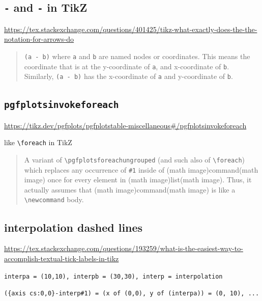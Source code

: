 \documentclass[
]{book}
\theoremstyle{definition}
\theoremstyle{definition}
\theoremstyle{definition}
\theoremstyle{definition}
\theoremstyle{remark}
\begin{document}
\subsection{\texorpdfstring{\texttt{\textbar{}-} and \texttt{-\textbar{}} in TikZ}{\textbar- and -\textbar{} in TikZ}}\label{and---in-tikz}

\url{https://tex.stackexchange.com/questions/401425/tikz-what-exactly-does-the-the-notation-for-arrows-do}

\begin{quote}
\texttt{(a\ -\textbar{}\ b)} where \texttt{a} and \texttt{b} are named nodes or coordinates. This means the coordinate that is at the y-coordinate of \texttt{a}, and x-coordinate of \texttt{b}. Similarly, \texttt{(a\ \textbar{}-\ b)} has the x-coordinate of \texttt{a} and y-coordinate of \texttt{b}.
\end{quote}

\subsection{\texorpdfstring{\texttt{pgfplotsinvokeforeach}}{pgfplotsinvokeforeach}}\label{pgfplotsinvokeforeach}

\url{https://tikz.dev/pgfplots/pgfplotstable-miscellaneous\#/pgfplotsinvokeforeach}

like \texttt{\textbackslash{}foreach} in TikZ

\begin{quote}
A variant of \texttt{\textbackslash{}pgfplotsforeachungrouped} (and such also of \texttt{\textbackslash{}foreach}) which replaces any occurrence of \texttt{\#1} inside of (math image)command(math image) once for every element in (math image)list(math image). Thus, it actually assumes that (math image)command(math image) is like a \texttt{\textbackslash{}newcommand} body.
\end{quote}

\subsection{interpolation dashed lines}\label{interpolation-dashed-lines}

\url{https://tex.stackexchange.com/questions/193259/what-is-the-easiest-way-to-accomplish-textual-tick-labels-in-tikz}

\texttt{interpa\ =\ (10,10),\ interpb\ =\ (30,30),\ interp\ =\ interpolation}

\texttt{(\{axis\ cs:0,0\}\textbar{}-interp\#1)\ =\ (x\ of\ (0,0),\ y\ of\ (interpa))\ =\ (0,\ 10),\ ...}
\end{document}
